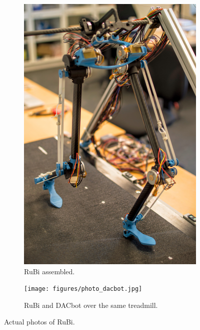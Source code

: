 \begin{figure}[ht!]
    \centering
    \begin{subfigure}[b]{0.49\textwidth}
        \includegraphics[width=\textwidth]{figures/photo_robot_walking.jpg}
        \caption{RuBi assembled.}
        \label{fig:photo_robot_walking}
    \end{subfigure}
    \begin{subfigure}[b]{0.49\textwidth}
        \texttt{[image: figures/photo\_dacbot.jpg]}
        \caption{RuBi and DACbot over the same treadmill.}
        \label{fig:photo_dacbot}
    \end{subfigure}
    \caption{Actual photos of RuBi.}
\end{figure}    

